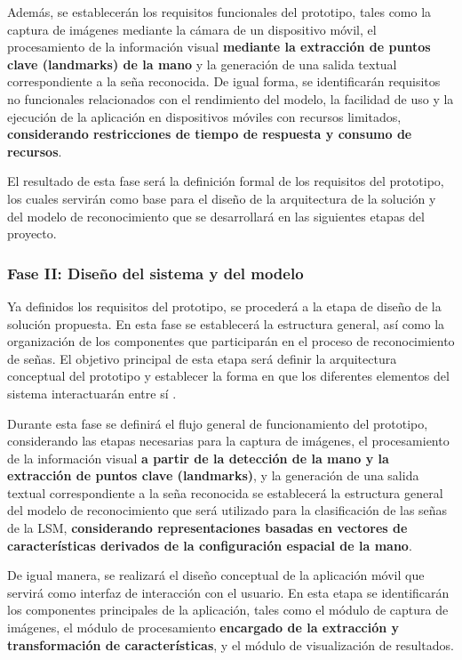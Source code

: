 	Además, se establecerán los requisitos funcionales del prototipo, tales como
	la captura de imágenes mediante la cámara de un dispositivo móvil, el
	procesamiento de la información visual \textbf{mediante la extracción de puntos clave (landmarks) de la mano} y la generación de una salida textual
	correspondiente a la seña reconocida. De igual forma, se identificarán
	requisitos no funcionales relacionados con el rendimiento del modelo, la
	facilidad de uso y la ejecución de la aplicación en dispositivos móviles con
	recursos limitados, \textbf{considerando restricciones de tiempo de respuesta y consumo de recursos}.
	
	El resultado de esta fase será la definición formal de los requisitos del
	prototipo, los cuales servirán como base para el diseño de la arquitectura de
	la solución y del modelo de reconocimiento que se desarrollará en las
	siguientes etapas del proyecto.
		
	\subsubsection{Fase II: Diseño del sistema y del modelo}
	
	Ya definidos los requisitos del prototipo, se procederá a la etapa de
	diseño de la solución propuesta. En esta fase se establecerá la estructura
	general, así como la organización de los componentes que
	participarán en el proceso de reconocimiento de señas. El objetivo principal
	de esta etapa será definir la arquitectura conceptual del prototipo y
	establecer la forma en que los diferentes elementos del sistema interactuarán
	entre sí \cite{pressman2014,sommerville2016}.
	
	Durante esta fase se definirá el flujo general de funcionamiento del prototipo,
	considerando las etapas necesarias para la captura de imágenes, el
	procesamiento de la información visual \textbf{a partir de la detección de la mano y la extracción de puntos clave (landmarks)}, y la generación de una salida textual
	correspondiente a la seña reconocida se establecerá la estructura
	general del modelo de reconocimiento que será utilizado para la clasificación
	de las señas de la LSM, \textbf{considerando representaciones basadas en vectores de características derivados de la configuración espacial de la mano}.
	
	De igual manera, se realizará el diseño conceptual de la aplicación móvil que
	servirá como interfaz de interacción con el usuario. En esta etapa se
	identificarán los componentes principales de la aplicación, tales como el
	módulo de captura de imágenes, el módulo de procesamiento \textbf{encargado de la extracción y transformación de características}, y el módulo de
	visualización de resultados.
	

